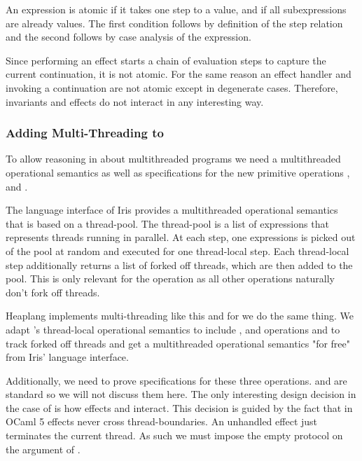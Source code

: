 An expression is atomic if it takes one step to a value, and if all subexpressions are already values.
The first condition follows by definition of the step relation and the second follows by case analysis of the expression.

Since performing an effect starts a chain of evaluation steps to capture the current continuation, it is not atomic.
For the same reason an effect handler and invoking a continuation are not atomic except in degenerate cases.
Therefore, invariants and effects do not interact in any interesting way.

\subsubsection*{Adding Multi-Threading to \hazel{}}

To allow reasoning in \hazel{} about multithreaded programs we need a multithreaded operational semantics as well as specifications for the new primitive operations \efork{},  and .

The language interface of Iris provides a multithreaded operational semantics that is based on a thread-pool.
The thread-pool is a list of expressions that represents threads running in parallel.
At each step, one expressions is picked out of the pool at random and executed for one thread-local step.
Each thread-local step additionally returns a list of forked off threads, which are then added to the pool.
This is only relevant for the \efork{} operation as all other operations naturally don't fork off threads.


Heaplang implements multi-threading like this and for \hazel{} we do the same thing.
We adapt \hazel{}'s thread-local operational semantics to include \efork{},  and  operations and to track forked off threads and get a multithreaded operational semantics "for free" from Iris' language interface.

Additionally, we need to prove specifications for these three operations.
 and  are standard so we will not discuss them here.
The only interesting design decision in the case of \hazel{} is how effects and \efork{} interact.
This decision is guided by the fact that in OCaml 5 effects never cross thread-boundaries.
An unhandled effect just terminates the current thread.
As such we must impose the empty protocol on the argument of \efork{}.


